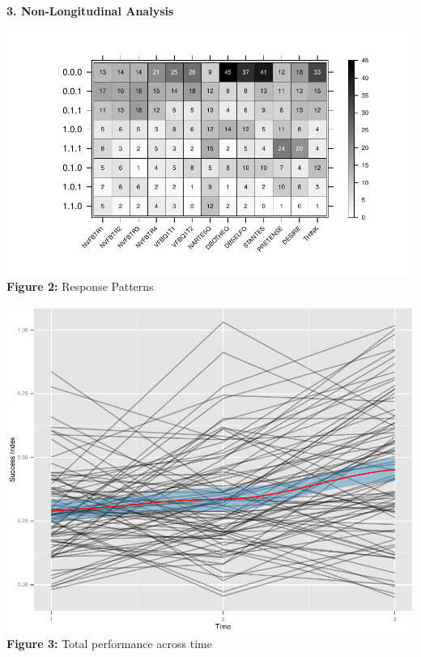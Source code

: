 \documentclass[portrait,final,archD,fontscale=0.477]{baposter}
\begin{document}
\begin{poster}
{\vspace{-1em}
\begin{tcolorbox}
\textbf{{\large 3. Non-Longitudinal Analysis}}
\end{tcolorbox}
\vspace{-2em}
\begin{center}
\includegraphics[trim=2cm 0.8cm 1.5cm 0.5cm,clip,width=1\linewidth]{./images-posterlatinr/Patterns}\\
\vspace{-0.4em}
\textbf{Figure 2:} Response Patterns
\end{center}
\vspace{-1.4em}
\begin{center}
\includegraphics[width=0.8\linewidth]{./images-posterlatinr/IndexPerformance} \\
\vspace{-0.5em}
\textbf{Figure 3:} Total performance across time
\end{center}

}
\end{poster}
\end{document}
